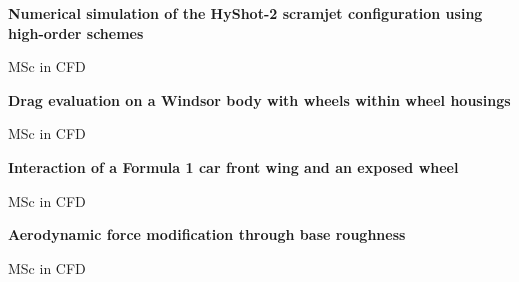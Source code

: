 \documentclass[11pt,a4paper]{article}
\newlength{\cventrysep}
\newenvironment{cventry}{%
  \par\noindent\begin{minipage}{\linewidth}
  \RaggedRight\fontsize{9.8}{12.5}\selectfont
}{\end{minipage}\par\addvspace{\cventrysep}}
\newcommand{\cvtitle}[1]{{\bfseries #1\par}\vspace{1pt}}
\newcommand{\cvmeta}[1]{{\fontsize{9}{11.5}\selectfont\color{Muted}#1\par}\vspace{1pt}}
\begin{document}
\begin{cventry}
\cvtitle{Numerical simulation of the HyShot-2 scramjet configuration using high-order schemes}
\cvmeta{MSc in CFD}
\end{cventry}

\begin{cventry}
\cvtitle{Drag evaluation on a Windsor body with wheels within wheel housings}
\cvmeta{MSc in CFD}
\end{cventry}

\begin{cventry}
\cvtitle{Interaction of a Formula 1 car front wing and an exposed wheel}
\cvmeta{MSc in CFD}
\end{cventry}

\begin{cventry}
\cvtitle{Aerodynamic force modification through base roughness}
\cvmeta{MSc in CFD}
\end{cventry}
\end{document}
